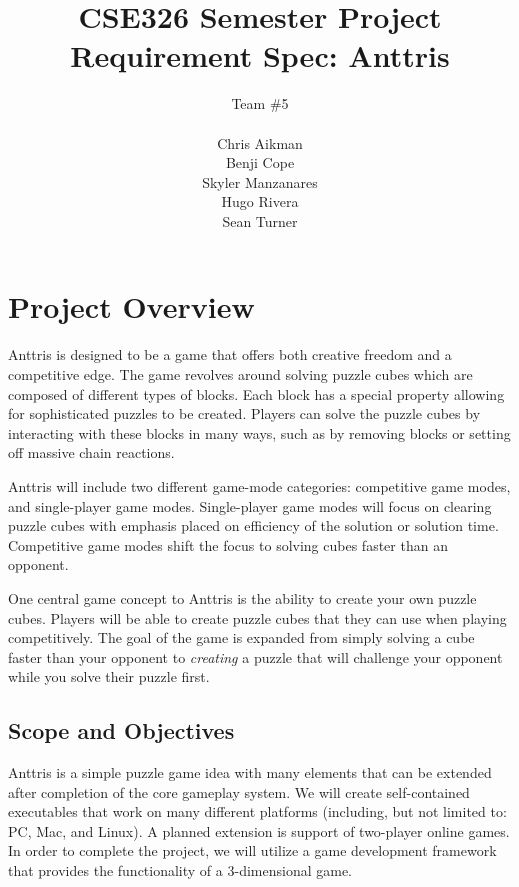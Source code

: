 \documentclass[12pt]{article}
\begin{document}
\title{CSE326 Semester Project Requirement Spec: Anttris}
\author{Team \#5\\\\Chris Aikman\\Benji Cope\\Skyler Manzanares\\Hugo Rivera\\Sean Turner}
\maketitle
\section{Project Overview}\label{overview-SM}
Anttris is designed to be a game that offers both creative freedom and a competitive edge. The game revolves around solving puzzle cubes which are composed of different types of blocks. Each block has a special property allowing for sophisticated puzzles to be created. Players can solve the puzzle cubes by interacting with these blocks in many ways, such as by removing blocks or setting off massive chain reactions.

Anttris will include two different game-mode categories: competitive game modes, and single-player game modes. Single-player game modes will focus on clearing puzzle cubes with emphasis placed on efficiency of the solution or solution time. Competitive game modes shift the focus to solving cubes faster than an opponent.

One central game concept to Anttris is the ability to create your own puzzle cubes. Players will be able to create puzzle cubes that they can use when playing competitively. The goal of the game is expanded from simply solving a cube faster than your opponent to \textsl{creating} a puzzle that will challenge your opponent while you solve their puzzle first.
\subsection{Scope and Objectives}\label{scope-obj-CA}
Anttris is a simple puzzle game idea with many elements that can be extended after completion of the core gameplay system. We will create self-contained executables that work on many different platforms (including, but not limited to: PC, Mac, and Linux). A planned extension is support of two-player online games.
In order to complete the project, we will utilize a game development framework that provides the functionality of a 3-dimensional game.
\end{document}
